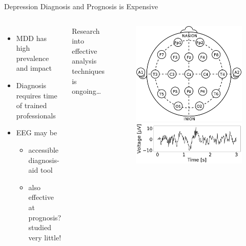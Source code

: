 \documentclass{beamer}
\begin{document}
\begin{frame}{Depression Diagnosis and Prognosis is Expensive}
	\begin{columns}
        \begin{itemize}
          \item MDD has high prevalence and impact \cite{olbrich2013eeg, whodepression}
          \item Diagnosis requires time of trained professionals \cite{whodepression}
          \item EEG may be 
            \begin{itemize}
              \item accessible diagnosis-aid tool \cite{schultz2012}
              \item also effective at prognosis? {\scriptsize studied very little!} 
            \end{itemize}
        \end{itemize}
        \vfill
        Research into effective analysis techniques is ongoing\ldots
            \begin{figure}
                \includegraphics[width=0.9\linewidth]{./Images/electrodes.png}
                \caption{\scriptsize \cite{10-20-system}}
                \includegraphics[width=\linewidth]{./Images/signal.png}
            \end{figure}
	\end{columns}
\end{frame}
\end{document}
